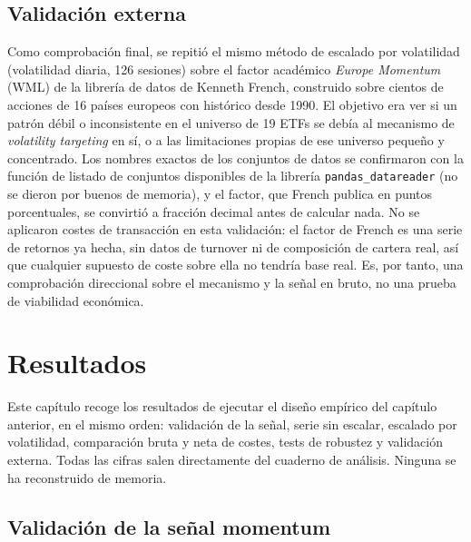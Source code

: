 \documentclass[12pt]{report} %
\begin{document}
\section{Validación externa}

Como comprobación final, se repitió el mismo método de escalado por volatilidad (volatilidad diaria, 126 sesiones) sobre el factor académico \textit{Europe Momentum} (WML) de la librería de datos de Kenneth French, construido sobre cientos de acciones de 16 países europeos con histórico desde 1990. El objetivo era ver si un patrón débil o inconsistente en el universo de 19 ETFs se debía al mecanismo de \textit{volatility targeting} en sí, o a las limitaciones propias de ese universo pequeño y concentrado. Los nombres exactos de los conjuntos de datos se confirmaron con la función de listado de conjuntos disponibles de la librería \texttt{pandas\_datareader} (no se dieron por buenos de memoria), y el factor, que French publica en puntos porcentuales, se convirtió a fracción decimal antes de calcular nada. No se aplicaron costes de transacción en esta validación: el factor de French es una serie de retornos ya hecha, sin datos de turnover ni de composición de cartera real, así que cualquier supuesto de coste sobre ella no tendría base real. Es, por tanto, una comprobación direccional sobre el mecanismo y la señal en bruto, no una prueba de viabilidad económica.

\chapter{Resultados}

Este capítulo recoge los resultados de ejecutar el diseño empírico del capítulo anterior, en el mismo orden: validación de la señal, serie sin escalar, escalado por volatilidad, comparación bruta y neta de costes, tests de robustez y validación externa. Todas las cifras salen directamente del cuaderno de análisis. Ninguna se ha reconstruido de memoria.

\section{Validación de la señal momentum}
\end{document}
